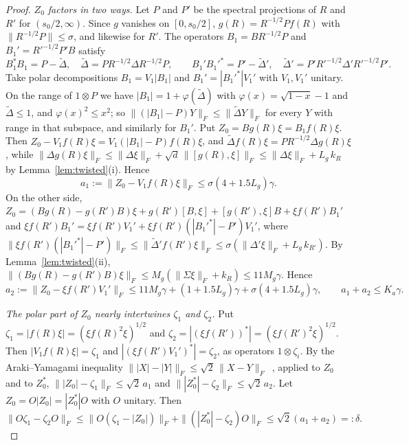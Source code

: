 \begin{proof}
\emph{$Z_0$ factors in two ways.} Let $P$ and $P'$ be the spectral projections of $R$ and $R'$ for $(s_0/2,\infty)$. Since $g$ vanishes on $[0,s_0/2]$,
$g(R)=R^{-1/2}Pf(R)$ with $\|R^{-1/2}P\|\le\sigma$, and likewise for $R'$. The operators $B_1=BR^{-1/2}P$ and $B_1'=R'^{-1/2}P'B$ satisfy
\[
B_1^*B_1=P-\tilde\Delta,\quad \tilde\Delta=PR^{-1/2}\Delta R^{-1/2}P,\qquad B_1'B_1'^*=P'-\tilde\Delta',\quad\tilde\Delta'=P'R'^{-1/2}\Delta'R'^{-1/2}P'.
\]
Take polar decompositions $B_1=V_1|B_1|$ and $B_1'=|B_1'^*|V_1'$ with $V_1,V_1'$ unitary. On the range of $1\otimes P$ we have
$|B_1|=1+\varphi(\tilde\Delta)$ with $\varphi(x)=\sqrt{1-x}-1$ and $\tilde\Delta\le1$, and $\varphi(x)^2\le x^2$; so $\|(|B_1|-P)Y\|_F\le\|\tilde\Delta Y\|_F$
for every $Y$ with range in that subspace, and similarly for $B_1'$. Put $Z_0=Bg(R)\xi=B_1f(R)\xi$. Then
$Z_0-V_1f(R)\xi=V_1(|B_1|-P)f(R)\xi$, and $\tilde\Delta f(R)\xi=PR^{-1/2}\Delta g(R)\xi$, while
$\|\Delta g(R)\xi\|_F\le\|\Delta\xi\|_F+\sqrt d\,\|[g(R),\xi]\|_F\le\|\Delta\xi\|_F+L_g\,k_R$ by Lemma~\ref{lem:twisted}(i). Hence
\[
a_1:=\|Z_0-V_1f(R)\xi\|_F\le\sigma(4+1.5L_g)\gamma .
\]
On the other side,
$Z_0=(Bg(R)-g(R')B)\xi+g(R')[B,\xi]+[g(R'),\xi]B+\xi f(R')B_1'$ and $\xi f(R')B_1'=\xi f(R')V_1'+\xi f(R')(|B_1'^*|-P')V_1'$, where
$\|\xi f(R')(|B_1'^*|-P')\|_F\le\|\tilde\Delta'f(R')\xi\|_F\le\sigma(\|\Delta'\xi\|_F+L_g\,k_{R'})$. By Lemma~\ref{lem:twisted}(ii),
$\|(Bg(R)-g(R')B)\xi\|_F\le M_g(\|\Sigma\xi\|_F+k_R)\le11M_g\gamma$. Hence
\[
a_2:=\|Z_0-\xi f(R')V_1'\|_F\le11M_g\gamma+(1+1.5L_g)\gamma+\sigma(4+1.5L_g)\gamma,\qquad a_1+a_2\le K_a\gamma .
\]

\emph{The polar part of $Z_0$ nearly intertwines $\zeta_1$ and $\zeta_2$.} Put $\zeta_1=|f(R)\xi|=(\xi f(R)^2\xi)^{1/2}$ and
$\zeta_2=|(\xi f(R'))^*|=(\xi f(R')^2\xi)^{1/2}$. Then $|V_1f(R)\xi|=\zeta_1$ and $|(\xi f(R')V_1')^*|=\zeta_2$, as operators $1\otimes\zeta_i$. By the
Araki--Yamagami inequality $\||X|-|Y|\|_F\le\sqrt2\,\|X-Y\|_F$~\cite{ArakiYamagami1981}, applied to $Z_0$ and to $Z_0^*$,
$\||Z_0|-\zeta_1\|_F\le\sqrt2\,a_1$ and $\||Z_0^*|-\zeta_2\|_F\le\sqrt2\,a_2$. Let $Z_0=O|Z_0|=|Z_0^*|O$ with $O$ unitary. Then
\[
\|O\zeta_1-\zeta_2O\|_F\le\|O(\zeta_1-|Z_0|)\|_F+\|(|Z_0^*|-\zeta_2)O\|_F\le\sqrt2(a_1+a_2)=:\delta .
\]


\end{proof}
